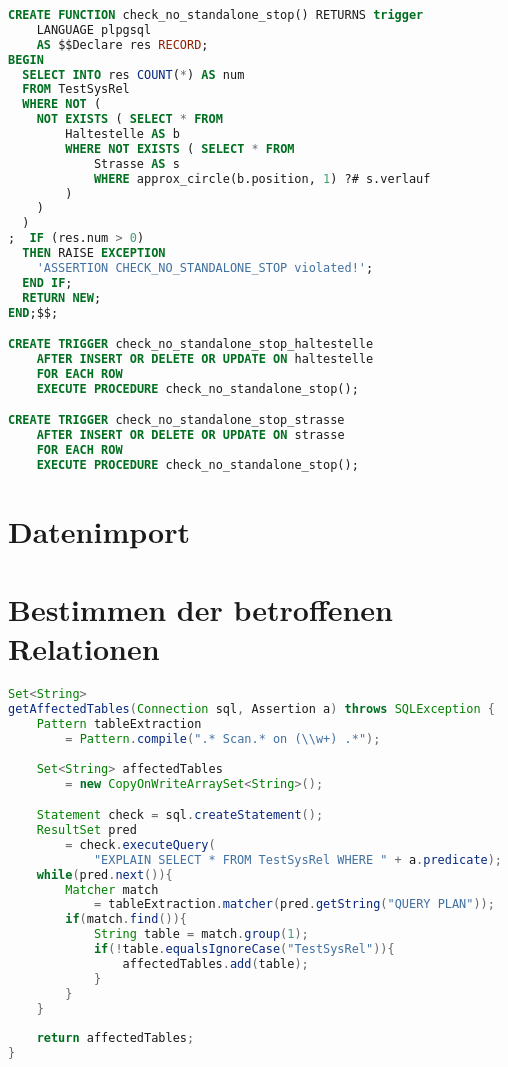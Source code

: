 \documentclass[a4paper]{article}
\begin{document}
\begin{lstlisting}[language=sql]
CREATE FUNCTION check_no_standalone_stop() RETURNS trigger
    LANGUAGE plpgsql
    AS $$Declare res RECORD;
BEGIN
  SELECT INTO res COUNT(*) AS num
  FROM TestSysRel
  WHERE NOT (
    NOT EXISTS ( SELECT * FROM
        Haltestelle AS b
        WHERE NOT EXISTS ( SELECT * FROM
            Strasse AS s
            WHERE approx_circle(b.position, 1) ?# s.verlauf
        )
    )
  )
;  IF (res.num > 0)
  THEN RAISE EXCEPTION
    'ASSERTION CHECK_NO_STANDALONE_STOP violated!';
  END IF;
  RETURN NEW;
END;$$;

CREATE TRIGGER check_no_standalone_stop_haltestelle
    AFTER INSERT OR DELETE OR UPDATE ON haltestelle
    FOR EACH ROW
    EXECUTE PROCEDURE check_no_standalone_stop();

CREATE TRIGGER check_no_standalone_stop_strasse
    AFTER INSERT OR DELETE OR UPDATE ON strasse
    FOR EACH ROW
    EXECUTE PROCEDURE check_no_standalone_stop();

\end{lstlisting}

\section{Datenimport}

\section{Bestimmen der betroffenen Relationen}

\begin{lstlisting}[language=java]
Set<String>
getAffectedTables(Connection sql, Assertion a) throws SQLException {
    Pattern tableExtraction
        = Pattern.compile(".* Scan.* on (\\w+) .*");
    
    Set<String> affectedTables
        = new CopyOnWriteArraySet<String>();

    Statement check = sql.createStatement();
    ResultSet pred
        = check.executeQuery(
            "EXPLAIN SELECT * FROM TestSysRel WHERE " + a.predicate);                
    while(pred.next()){
        Matcher match
            = tableExtraction.matcher(pred.getString("QUERY PLAN"));
        if(match.find()){
            String table = match.group(1);
            if(!table.equalsIgnoreCase("TestSysRel")){
                affectedTables.add(table);
            }
        }
    }
    
    return affectedTables;
}
\end{lstlisting}
\end{document}
